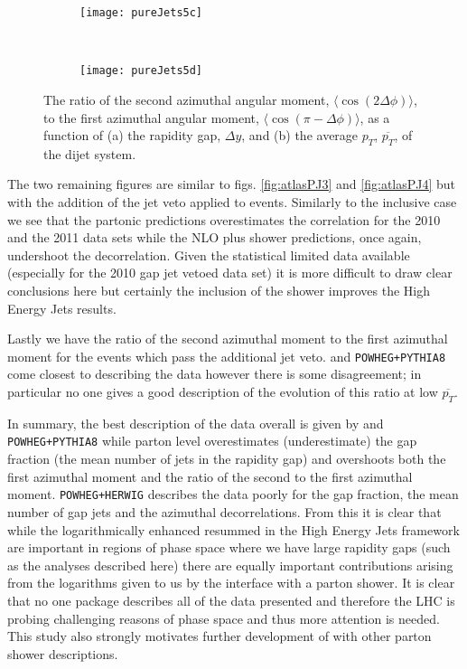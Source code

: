 	\begin{figure}[bth]
		\begin{subfigure}[b]{0.48\textwidth}
			\texttt{[image: pureJets5c]}
			\caption{}
			\label{fig:}
		\end{subfigure}
		~
		\begin{subfigure}[b]{0.48\textwidth}
			\texttt{[image: pureJets5d]}
			\caption{}
			\label{fig:}
		\end{subfigure}
		\caption{The ratio of the second azimuthal angular moment, $\langle \cos(2\Delta\phi)\rangle$,
		to the first azimuthal angular moment, $\langle \cos(\pi-\Delta\phi)\rangle$, as a function of
		(a) the rapidity gap, $\Delta y$, and (b) the average $p_T$, $\overline{p_T}$, of the dijet system.}
		\label{fig:atlasPJ4}
	\end{figure}

	The two remaining figures are similar to figs. \eqref{fig:atlasPJ3} and \eqref{fig:atlasPJ4} but
	with the addition of the jet veto applied to events.  Similarly to the inclusive case we see that the partonic \HEJ
	predictions overestimates the correlation for the 2010 and the 2011 data sets while the NLO plus
	shower predictions, once again, undershoot the decorrelation.  Given the statistical limited
	data available (especially for the 2010 gap jet vetoed data set) it is more difficult to draw
	clear conclusions here but certainly the inclusion of the \ARIADNE shower improves the High
	Energy Jets results.

	Lastly we have the ratio of the second azimuthal moment to the first azimuthal moment for the
	events which pass the additional jet veto.  \HEJA and \texttt{POWHEG+PYTHIA8} come closest
	to describing the data however there is some disagreement; in particular no one gives a good
	description of the evolution of this ratio at low $\overline{p_T}$.

	In summary, the best description of the data overall is given by \HEJA and \texttt{POWHEG+PYTHIA8}
	while parton level \HEJ overestimates (underestimate) the gap fraction (the mean number of jets
	in the rapidity gap) and overshoots both the first azimuthal
	moment and the ratio of the second to the first azimuthal moment.  \texttt{POWHEG+HERWIG} describes
	the data poorly for the gap fraction, the mean number of gap jets and the azimuthal decorrelations.
	From this it is clear that while the logarithmically enhanced resummed in the High Energy Jets
	framework are important in regions of phase space where we have large rapidity gaps (such as the
	analyses described here) there are equally important contributions arising from the logarithms
	given to us by the interface with a parton shower.  It is clear that no one package describes all
	of the data presented and therefore the LHC is probing challenging reasons of phase space and thus
	more attention is needed.  This study also strongly motivates further development of \hej with
	other parton shower descriptions.


